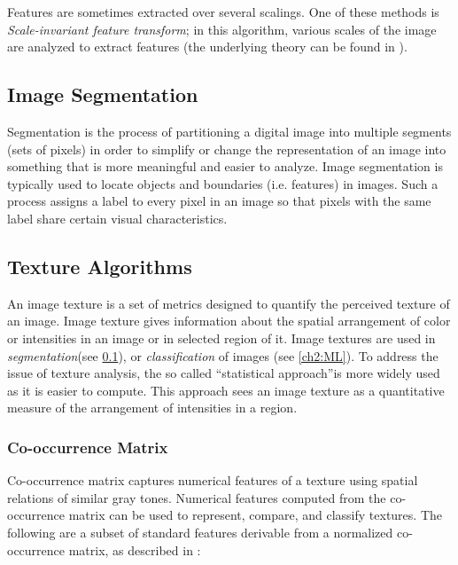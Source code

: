 Features are sometimes extracted over several scalings. One of these methods is \textit{Scale-invariant feature transform};
in this algorithm, various scales of the image are analyzed to extract features\cite{LoweScale} (the underlying theory can be found in \cite{feature01ScaleSpace}).\\


\subsection{Image Segmentation}
\label{ch2:IS}
Segmentation is the process of partitioning a digital image into multiple segments (sets of pixels) in order to simplify
or change the representation of an image into something that is more meaningful and easier to analyze\cite{breastCancer02}.
Image segmentation is typically used to locate objects and boundaries (i.e. features) in images. 
Such a process assigns a label to every pixel in an image so that pixels with the same label share certain visual characteristics\cite{mitosisDetectionLearningBased}.


\subsection{Texture Algorithms}

An image texture is a set of metrics designed to quantify the perceived texture of an image.
Image texture gives information about the spatial arrangement of color or intensities in an image or in selected region of it\cite{ CV_Forsyth}.
Image textures are used in \textit{segmentation}(see \ref{ch2:IS}), or \textit{classification} of images (see \ref{ch2:ML}).
To address the issue of texture analysis, the so called \textquotedblleft{}statistical approach\textquotedblright  is more widely used as it is easier to compute.
This approach sees an image texture as a quantitative measure of the arrangement of intensities in a region.

\subsubsection{Co-occurrence Matrix}

Co-occurrence matrix captures numerical features of a texture using spatial relations of similar gray tones.
Numerical features computed from the co-occurrence matrix can be used to represent, compare, and classify textures\cite{textureGLCMexample, textureGLCM_wood}.
The following are a subset of standard features derivable from a normalized co-occurrence matrix, as described in \cite{haralick1973textural}:

